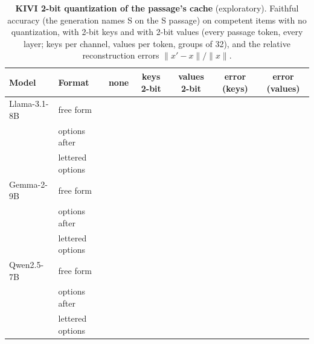 \begin{table}[!ht]
\centering
\footnotesize
\caption{\textbf{KIVI 2-bit quantization of the passage's cache} (exploratory). Faithful accuracy (the generation names S on the S passage) on competent items with no quantization, with 2-bit keys and with 2-bit values (every passage token, every layer; keys per channel, values per token, groups of 32), and the relative reconstruction errors $\lVert x' - x \rVert / \lVert x \rVert$.}
\label{tab:kivi}
\setlength{\tabcolsep}{5pt}
\begin{tabular}{@{}llccccc@{}}
\toprule
Model & Format & none & keys 2-bit & values 2-bit & error (keys) & error (values) \\
\midrule
Llama-3.1-8B & free form & \JaKiviNoneNomLlamaEight{} & \JaKiviKtwoNomLlamaEight{} & \JaKiviVtwoNomLlamaEight{} & \JaKiviErrKNomLlamaEight{} & \JaKiviErrVNomLlamaEight{} \\
 & options after & \JaKiviNoneOptaLlamaEight{} & \JaKiviKtwoOptaLlamaEight{} & \JaKiviVtwoOptaLlamaEight{} & \JaKiviErrKOptaLlamaEight{} & \JaKiviErrVOptaLlamaEight{} \\
 & lettered options & \JaKiviNoneLetaLlamaEight{} & \JaKiviKtwoLetaLlamaEight{} & \JaKiviVtwoLetaLlamaEight{} & \JaKiviErrKLetaLlamaEight{} & \JaKiviErrVLetaLlamaEight{} \\
\addlinespace[2pt]
Gemma-2-9B & free form & \JaKiviNoneNomGemmaNine{} & \JaKiviKtwoNomGemmaNine{} & \JaKiviVtwoNomGemmaNine{} & \JaKiviErrKNomGemmaNine{} & \JaKiviErrVNomGemmaNine{} \\
 & options after & \JaKiviNoneOptaGemmaNine{} & \JaKiviKtwoOptaGemmaNine{} & \JaKiviVtwoOptaGemmaNine{} & \JaKiviErrKOptaGemmaNine{} & \JaKiviErrVOptaGemmaNine{} \\
 & lettered options & \JaKiviNoneLetaGemmaNine{} & \JaKiviKtwoLetaGemmaNine{} & \JaKiviVtwoLetaGemmaNine{} & \JaKiviErrKLetaGemmaNine{} & \JaKiviErrVLetaGemmaNine{} \\
\addlinespace[2pt]
Qwen2.5-7B & free form & \JaKiviNoneNomQwenSeven{} & \JaKiviKtwoNomQwenSeven{} & \JaKiviVtwoNomQwenSeven{} & \JaKiviErrKNomQwenSeven{} & \JaKiviErrVNomQwenSeven{} \\
 & options after & \JaKiviNoneOptaQwenSeven{} & \JaKiviKtwoOptaQwenSeven{} & \JaKiviVtwoOptaQwenSeven{} & \JaKiviErrKOptaQwenSeven{} & \JaKiviErrVOptaQwenSeven{} \\
 & lettered options & \JaKiviNoneLetaQwenSeven{} & \JaKiviKtwoLetaQwenSeven{} & \JaKiviVtwoLetaQwenSeven{} & \JaKiviErrKLetaQwenSeven{} & \JaKiviErrVLetaQwenSeven{} \\

\end{tabular}
\end{table}

